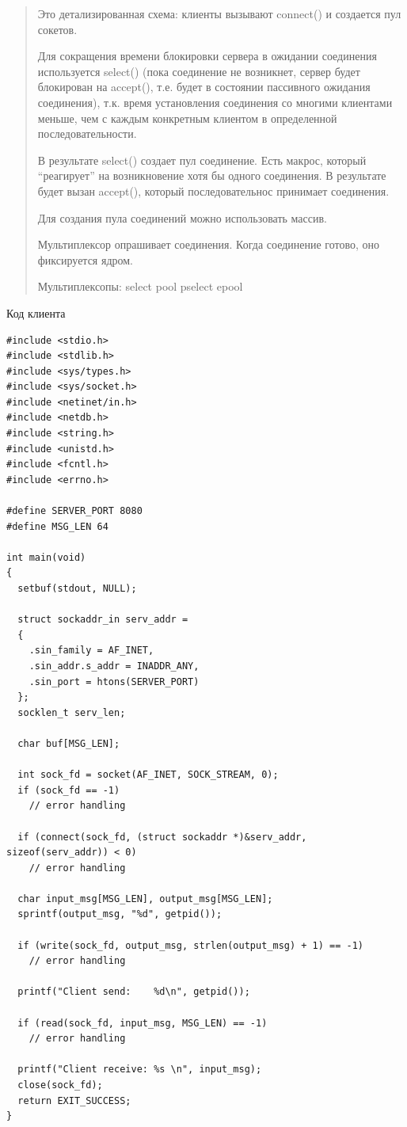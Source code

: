 \begin{quote}
Это детализированная схема: клиенты вызывают connect() и создается пул сокетов.

Для сокращения времени блокировки сервера в ожидании соединения используется select() (пока соединение не возникнет, сервер будет блокирован на accept(), т.е. будет в состоянии пассивного ожидания соединения), т.к. время установления соединения со многими клиентами меньше, чем с каждым конкретным клиентом в определенной последовательности.

В результате select() создает пул соединение. Есть макрос, который “реагирует” на возникновение хотя бы одного соединения. В результате будет вызан accept(), который последовательнос принимает соединения.

Для создания пула соединений можно использовать массив.

Мультиплексор опрашивает соединения. Когда соединение готово, оно фиксируется ядром.

Мультиплексопы: 
select    pool
pselect   epool
\end{quote}

Код клиента
\begin{lstlisting}
#include <stdio.h>
#include <stdlib.h>
#include <sys/types.h>
#include <sys/socket.h>
#include <netinet/in.h>
#include <netdb.h>
#include <string.h>
#include <unistd.h>
#include <fcntl.h>
#include <errno.h>

#define SERVER_PORT 8080
#define MSG_LEN 64

int main(void)
{
  setbuf(stdout, NULL);

  struct sockaddr_in serv_addr =
  {
    .sin_family = AF_INET,
    .sin_addr.s_addr = INADDR_ANY,
    .sin_port = htons(SERVER_PORT)
  };
  socklen_t serv_len;

  char buf[MSG_LEN];

  int sock_fd = socket(AF_INET, SOCK_STREAM, 0);
  if (sock_fd == -1)
    // error handling

  if (connect(sock_fd, (struct sockaddr *)&serv_addr, sizeof(serv_addr)) < 0)
    // error handling

  char input_msg[MSG_LEN], output_msg[MSG_LEN];
  sprintf(output_msg, "%d", getpid());

  if (write(sock_fd, output_msg, strlen(output_msg) + 1) == -1)
    // error handling

  printf("Client send:    %d\n", getpid());

  if (read(sock_fd, input_msg, MSG_LEN) == -1)
    // error handling

  printf("Client receive: %s \n", input_msg);
  close(sock_fd);
  return EXIT_SUCCESS;
}
\end{lstlisting}

